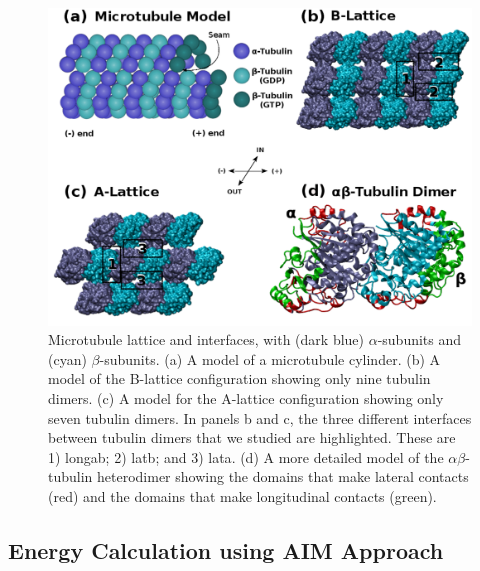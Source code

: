 \documentclass[11pt]{report}
\begin{document}
\begin{figure}
  \centering
  \includegraphics[width=0.8\linewidth,trim= 0.1cm 0.1cm 0.1cm 0.1cm, clip=true]{images/System.pdf}
  \caption[Microtubule lattice and interfaces]{Microtubule lattice and interfaces, with (dark blue) $\alpha$-subunits and (cyan) $\beta$-subunits. (a) A model of a microtubule cylinder. (b) A model of the B-lattice configuration showing only nine tubulin dimers. (c) A model for the A-lattice configuration showing only seven tubulin dimers. In panels b and c, the three different interfaces between tubulin dimers that we studied are highlighted. These are 1) \gls{longab}; 2) \gls{latb}; and 3) \gls{lata}. (d) A more detailed model of the $\alpha$$\beta$-tubulin heterodimer showing the domains that make lateral contacts (red) and the domains that make longitudinal contacts (green).}
  \label{f:THB-system}
\end{figure}

\subsection{Energy Calculation using AIM Approach}
\label{ss:THB-Methods_AIM}
\end{document}
